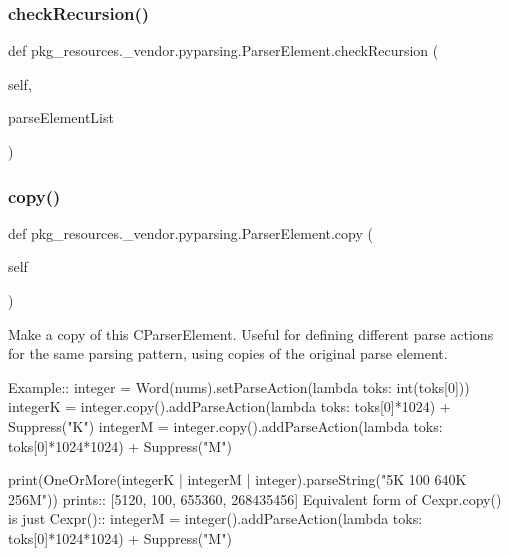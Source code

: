 \subsubsection{\texorpdfstring{check\+Recursion()}{checkRecursion()}}
{\footnotesize\ttfamily def pkg\+\_\+resources.\+\_\+vendor.\+pyparsing.\+Parser\+Element.\+check\+Recursion (\begin{DoxyParamCaption}\item[{}]{self,  }\item[{}]{parse\+Element\+List }\end{DoxyParamCaption})}

\mbox{\label{classpkg__resources_1_1__vendor_1_1pyparsing_1_1ParserElement_a4bd956ef315744a6fda3bfa660121750}} 
\subsubsection{\texorpdfstring{copy()}{copy()}}
{\footnotesize\ttfamily def pkg\+\_\+resources.\+\_\+vendor.\+pyparsing.\+Parser\+Element.\+copy (\begin{DoxyParamCaption}\item[{}]{self }\end{DoxyParamCaption})}

\begin{DoxyVerb}Make a copy of this C{ParserElement}.  Useful for defining different parse actions
for the same parsing pattern, using copies of the original parse element.

Example::
    integer = Word(nums).setParseAction(lambda toks: int(toks[0]))
    integerK = integer.copy().addParseAction(lambda toks: toks[0]*1024) + Suppress("K")
    integerM = integer.copy().addParseAction(lambda toks: toks[0]*1024*1024) + Suppress("M")
    
    print(OneOrMore(integerK | integerM | integer).parseString("5K 100 640K 256M"))
prints::
    [5120, 100, 655360, 268435456]
Equivalent form of C{expr.copy()} is just C{expr()}::
    integerM = integer().addParseAction(lambda toks: toks[0]*1024*1024) + Suppress("M")
\end{DoxyVerb}
 \mbox{\label{classpkg__resources_1_1__vendor_1_1pyparsing_1_1ParserElement_a93be52be442d95742db8b799a5a1c7b3}} 
